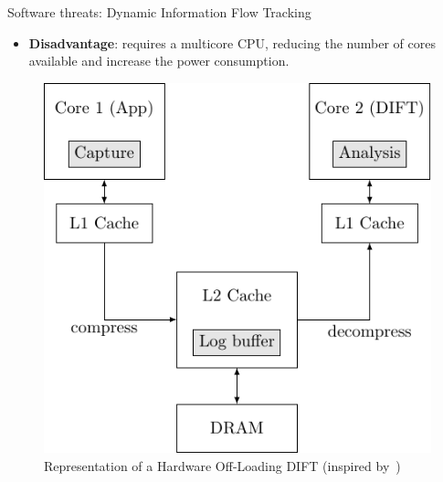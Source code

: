 \begin{frame}{Software threats: Dynamic Information Flow Tracking}
\begin{minipage}[c]{0.45\textwidth}
        \begin{alertblock}{}
            \begin{itemize}
                [square]
                \justifying
                \item \textbf{Disadvantage}: requires a multicore CPU, reducing the number of cores available and increase the power consumption.
            \end{itemize}
        \end{alertblock}
    \end{minipage}\hfill%
    \begin{minipage}[c]{0.5\textwidth}
        \begin{figure}
            \centering
            \includegraphics[height=.75\textheight]{src/1_introduction/img/offloading.pdf}
            \caption{Representation of a Hardware Off-Loading DIFT (inspired by~\cite{KDK-09-dsn})}
            \label{fig:offloading}
        \end{figure}
    \end{minipage}
\end{frame}

